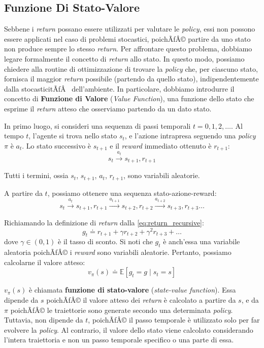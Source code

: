 ﻿\documentclass[11pt, a4paper]{report}
\begin{document}
\subsection{Funzione Di Stato-Valore}

Sebbene i \emph{return} possano essere utilizzati per valutare le \emph{policy}, essi non possono essere applicati nel caso di problemi stocastici, poichÃƒÂ© partire da uno stato non produce sempre lo stesso \emph{return}. Per affrontare questo problema, dobbiamo legare formalmente il concetto di \emph{return} allo stato. In questo modo, possiamo chiedere alla routine di ottimizzazione di trovare la \emph{policy} che, per ciascuno stato, fornisca il maggior \emph{return} possibile (partendo da quello stato), indipendentemente dalla stocasticitÃƒÂ  dell'ambiente. In particolare, dobbiamo introdurre il concetto di \textbf{Funzione di Valore} (\emph{Value Function}), una funzione dello stato che esprime il \emph{return} atteso che osserviamo partendo da un dato stato.

In primo luogo, si consideri una sequenza di passi temporali $t = 0, 1, 2, \dots$. Al tempo $t$, l'agente si trova nello stato $s_t$, e l'azione intrapresa seguendo una \emph{policy} $\pi$ è $a_t$. Lo stato successivo è $s_{t+1}$ e il \emph{reward} immediato ottenuto è $r_{t+1}$:
\[ s_t \xrightarrow{a_t} s_{t+1}, r_{t+1} \]

\newpage

Tutti i termini, ossia $s_t$, $s_{t+1}$, $a_t$, $r_{t+1}$, sono variabili aleatorie.

A partire da $t$, possiamo ottenere una sequenza stato-azione-reward:
\[ s_t \xrightarrow{a_t} s_{t+1}, r_{t+1} \xrightarrow{a_{t+1}} s_{t+2}, r_{t+2} \xrightarrow{a_{t+2}} s_{t+3}, r_{t+3} \dots \]

Richiamando la definizione di \emph{return} dalla \eqref{eq:return_recursive}:
\[ g_t \doteq r_{t+1} + \gamma r_{t+2} + \gamma^2 r_{t+3} + \dots \]
dove $\gamma \in (0, 1)$ è il tasso di sconto. Si noti che $g_t$ è anch'essa una variabile aleatoria poichÃƒÂ© i \emph{reward} sono variabili aleatorie. Pertanto, possiamo calcolarne il valore atteso:
\[ v_\pi(s) \doteq \mathbb{E}[g_t = g \mid s_t = s] \]

$v_\pi(s)$ è chiamata \textbf{funzione di stato-valore} (\emph{state-value function}). Essa dipende da $s$ poichÃƒÂ© il valore atteso dei \emph{return} è calcolato a partire da $s$, e da $\pi$ poichÃƒÂ© le traiettorie sono generate secondo una determinata \emph{policy}. Tuttavia, non dipende da $t$, poichÃƒÂ© il passo temporale è utilizzato solo per far evolvere la \emph{policy}. Al contrario, il valore dello stato viene calcolato considerando l'intera traiettoria e non un passo temporale specifico o una parte di essa.
\end{document}
